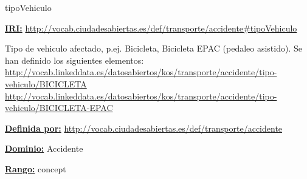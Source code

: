 \begin{mybox}{tipoVehiculo}
\begin{flushleft}
\underline{\textbf{IRI:}}
\url{http://vocab.ciudadesabiertas.es/def/transporte/accidente#tipoVehiculo}
\newline

Tipo de vehiculo afectado, p.ej. Bicicleta, Bicicleta EPAC (pedaleo asistido). Se han definido los siguientes elementos:
\newline \url{http://vocab.linkeddata.es/datosabiertos/kos/transporte/accidente/tipo-vehiculo/BICICLETA}
\newline \url{http://vocab.linkeddata.es/datosabiertos/kos/transporte/accidente/tipo-vehiculo/BICICLETA-EPAC}
\newline

\underline{\textbf{Definida por:}}\newline
\url{http://vocab.ciudadesabiertas.es/def/transporte/accidente}
\newline

\underline{\textbf{Dominio:}} Accidente
\newline

\underline{\textbf{Rango:}} concept
\newline

\end{flushleft}
\end{mybox}



